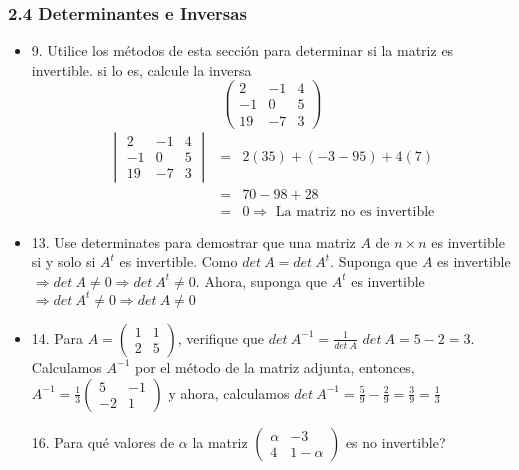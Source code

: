 \documentclass[12pt]{article}
\theoremstyle{plain}
\theoremstyle{definition}
\begin{document}
\subsubsection{2.4 Determinantes e Inversas}
\begin{itemize}
    \item 9. Utilice los métodos de esta sección para determinar si la matriz es invertible. si lo es, calcule la inversa
    \[\begin{pmatrix}2&-1&4\\-1&0&5\\19&-7&3\end{pmatrix}\]
    \begin{eqnarray*}
    \begin{vmatrix}2&-1&4\\-1&0&5\\19&-7&3\end{vmatrix}&=&2(35)+(-3-95)+4(7)\\
    &=&70-98+28\\
    &=&0\Rightarrow \text{ La matriz no es invertible}
    \end{eqnarray*}
    
    
    \item 13. Use determinates para demostrar que una matriz $A$ de $n\times n$ es invertible si y solo si $A^t$ es invertible.
    Como $det\ A= det\ A^t$. Suponga que $A$ es invertible $\Rightarrow det\ A\neq 0 \Rightarrow det\ A^t\neq 0 $. Ahora, suponga que $A^t$ es invertible  $\Rightarrow det\ A^t\neq 0 \Rightarrow det\ A\neq 0 $
    \item 14. Para $A=\begin{pmatrix}1 &1\\2&5\end{pmatrix}$, verifique que $det\ A^{-1}=\frac{1}{det\ A}$
    $det\ A=5-2=3$. Calculamos $A^{-1}$ por el método de la matriz adjunta, entonces, $A^{-1}=\frac{1}{3}\begin{pmatrix}5 &-1\\-2&1\end{pmatrix}$ y ahora, calculamos $det\ A^{-1}=\frac{5}{9}-\frac{2}{9}=\frac{3}{9}=\frac{1}{3}$
    \item[16.] \textquestiondown Para qué valores de $\alpha$ la matriz $\begin{pmatrix}\alpha&-3\\4&1-\alpha\end{pmatrix}$ es no invertible?
    

\end{itemize}
\end{document}
